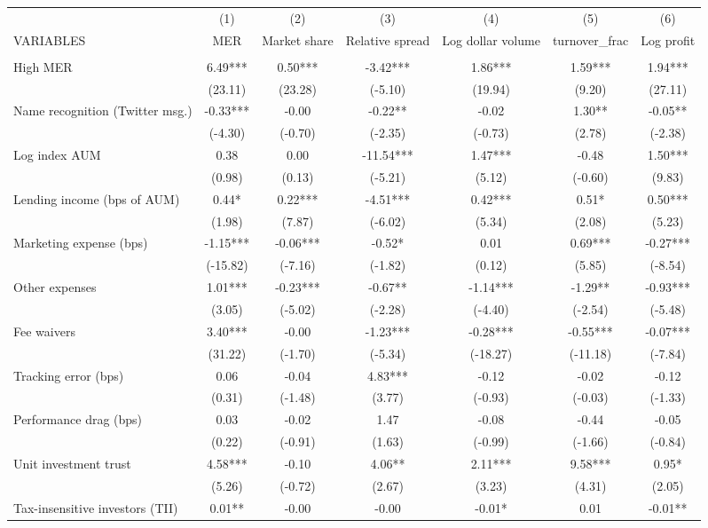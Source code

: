 \documentclass[]{article}
\begin{document}
\begin{tabular}{lcccccc} \hline
 & (1) & (2) & (3) & (4) & (5) & (6) \\
VARIABLES & MER & Market share & Relative spread & Log dollar volume & turnover\_frac & Log profit \\ \hline
 &  &  &  &  &  &  \\
High MER & 6.49*** & 0.50*** & -3.42*** & 1.86*** & 1.59*** & 1.94*** \\
 & (23.11) & (23.28) & (-5.10) & (19.94) & (9.20) & (27.11) \\
Name recognition (Twitter msg.) & -0.33*** & -0.00 & -0.22** & -0.02 & 1.30** & -0.05** \\
 & (-4.30) & (-0.70) & (-2.35) & (-0.73) & (2.78) & (-2.38) \\
Log index AUM & 0.38 & 0.00 & -11.54*** & 1.47*** & -0.48 & 1.50*** \\
 & (0.98) & (0.13) & (-5.21) & (5.12) & (-0.60) & (9.83) \\
Lending income (bps of AUM) & 0.44* & 0.22*** & -4.51*** & 0.42*** & 0.51* & 0.50*** \\
 & (1.98) & (7.87) & (-6.02) & (5.34) & (2.08) & (5.23) \\
Marketing expense (bps) & -1.15*** & -0.06*** & -0.52* & 0.01 & 0.69*** & -0.27*** \\
 & (-15.82) & (-7.16) & (-1.82) & (0.12) & (5.85) & (-8.54) \\
Other expenses & 1.01*** & -0.23*** & -0.67** & -1.14*** & -1.29** & -0.93*** \\
 & (3.05) & (-5.02) & (-2.28) & (-4.40) & (-2.54) & (-5.48) \\
Fee waivers & 3.40*** & -0.00 & -1.23*** & -0.28*** & -0.55*** & -0.07*** \\
 & (31.22) & (-1.70) & (-5.34) & (-18.27) & (-11.18) & (-7.84) \\
Tracking error (bps) & 0.06 & -0.04 & 4.83*** & -0.12 & -0.02 & -0.12 \\
 & (0.31) & (-1.48) & (3.77) & (-0.93) & (-0.03) & (-1.33) \\
Performance drag (bps) & 0.03 & -0.02 & 1.47 & -0.08 & -0.44 & -0.05 \\
 & (0.22) & (-0.91) & (1.63) & (-0.99) & (-1.66) & (-0.84) \\
Unit investment trust & 4.58*** & -0.10 & 4.06** & 2.11*** & 9.58*** & 0.95* \\
 & (5.26) & (-0.72) & (2.67) & (3.23) & (4.31) & (2.05) \\
Tax-insensitive investors (TII) & 0.01** & -0.00 & -0.00 & -0.01* & 0.01 & -0.01** \\

\end{tabular}
\end{document}
